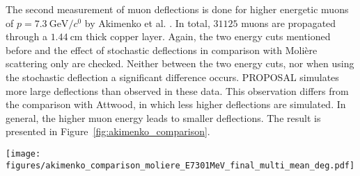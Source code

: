 The second measurement of muon deflections is done for higher energetic muons 
of $p = \SI[per-mode=symbol]{7.3}{\giga\electronvolt\per\clight}$ by Akimenko et al. \cite{akimenko_1984}.
In total, $\num{31125}$ muons are propagated through a $\SI{1.44}{\centi\meter}$ thick 
copper layer. Again, the two energy cuts mentioned before and the effect of stochastic deflections 
in comparison with Molière scattering only are checked. 
Neither between the two energy cuts, nor when using the stochastic deflection a significant difference occurs. 
PROPOSAL simulates more large deflections than observed in these data. This observation differs from the comparison with Attwood, 
in which less higher deflections are simulated. In general, the higher muon energy 
leads to smaller deflections. The result is presented in Figure~\ref{fig:akimenko_comparison}.
\begin{figure*}
    \centering 
    \texttt{[image: figures/akimenko\_comparison\_moliere\_E7301MeV\_final\_multi\_mean\_deg.pdf]}
    \caption{A comparison between two PROPOSAL settings and measured data by Akimenko et al. \cite{akimenko_1984} 
    is presented for the normalized counts in dependence of the projected scattering angle $\theta_{\mathrm{y}}$ in degree.
    $\num{100}$ simulations each with $\num{31125}$ muons with 
    $E_{\mathrm{i}} = \SI{7.301}{\giga\electronvolt}$ are propagated through a $\SI{1.44}{\centi\meter}$ 
    copper layer using the energy cut 
    $v_{\mathrm{cut}} = \num{e-5}$. The blue points present the mean considering stochastic deflections and Molière scattering, the orange points
    present the mean taking into account only Molière scattering. The uncertainties on the $x$--axis result due to the measured bin widths. The $y$--uncertainties are the standard deviations for PROPOSAL and the Poisson errors with $\sqrt{N}$ for Akimenko, with $N$ as number of counts. More large deflections are simulated by PROPOSAL.
    Considering stochastic deflections has no significant impact.}
    \label{fig:akimenko_comparison}
\end{figure*}

